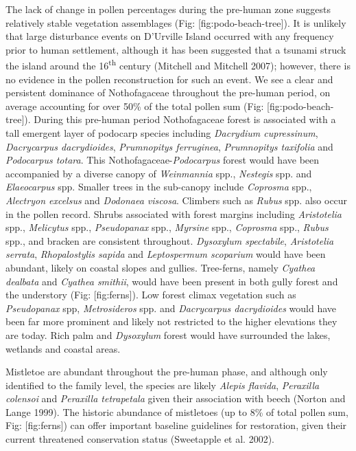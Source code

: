 The lack of change in pollen percentages during the pre-human zone
suggests relatively stable vegetation assemblages (Fig:
{[}fig:podo-beach-tree{]}). It is unlikely that large disturbance events
on D'Urville Island occurred with any frequency prior to human
settlement, although it has been suggested that a tsunami struck the
island around the 16\textsuperscript{th} century (Mitchell and Mitchell
2007); however, there is no evidence in the pollen reconstruction for
such an event. We see a clear and persistent dominance of Nothofagaceae
throughout the pre-human period, on average accounting for over 50\% of
the total pollen sum (Fig: {[}fig:podo-beach-tree{]}). During this
pre-human period Nothofagaceae forest is associated with a tall emergent
layer of podocarp species including \emph{Dacrydium cupressinum},
\emph{Dacrycarpus dacrydioides}, \emph{Prumnopitys ferruginea},
\emph{Prumnopitys taxifolia} and \emph{Podocarpus totara}. This
Nothofagaceae-\emph{Podocarpus} forest would have been accompanied by a
diverse canopy of \emph{Weinmannia} spp., \emph{Nestegis} spp. and
\emph{Elaeocarpus} spp. Smaller trees in the sub-canopy include
\emph{Coprosma} spp., \emph{Alectryon excelsus} and \emph{Dodonaea
viscosa}. Climbers such as \emph{Rubus} spp. also occur in the pollen
record. Shrubs associated with forest margins including
\emph{Aristotelia} spp., \emph{Melicytus} spp., \emph{Pseudopanax} spp.,
\emph{Myrsine} spp., \emph{Coprosma} spp., \emph{Rubus} spp., and
bracken are consistent throughout. \emph{Dysoxylum spectabile},
\emph{Aristotelia serrata}, \emph{Rhopalostylis sapida} and
\emph{Leptospermum scoparium} would have been abundant, likely on
coastal slopes and gullies. Tree-ferns, namely \emph{Cyathea dealbata}
and \emph{Cyathea smithii}, would have been present in both gully forest
and the understory (Fig: {[}fig:ferns{]}). Low forest climax vegetation
such as \emph{Pseudopanax} spp, \emph{Metrosideros} spp. and
\emph{Dacrycarpus dacrydioides} would have been far more prominent and
likely not restricted to the higher elevations they are today. Rich palm
and \emph{Dysoxylum} forest would have surrounded the lakes, wetlands
and coastal areas.

Mistletoe are abundant throughout the pre-human phase, and although only
identified to the family level, the species are likely \emph{Alepis
flavida}, \emph{Peraxilla colensoi} and \emph{Peraxilla tetrapetala}
given their association with beech (Norton and Lange 1999). The historic
abundance of mistletoes (up to 8\% of total pollen sum, Fig:
{[}fig:ferns{]}) can offer important baseline guidelines for
restoration, given their current threatened conservation status
(Sweetapple et al. 2002).

